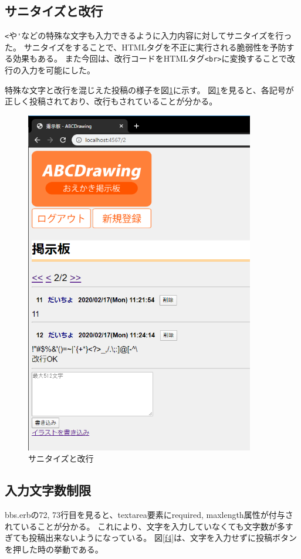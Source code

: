\documentclass[a4j,titlepage]{jsarticle}
\begin{document}
\subsection{サニタイズと改行}
\verb|<|や\verb|'|などの特殊な文字も入力できるように入力内容に対してサニタイズを行った。
サニタイズをすることで、HTMLタグを不正に実行される脆弱性を予防する効果もある。
また今回は、改行コードをHTMLタグ{\tt\verb|<br>|}に変換することで改行の入力を可能にした。

特殊な文字と改行を混じえた投稿の様子を図\ref{f3}に示す。
図\ref{f3}を見ると、各記号が正しく投稿されており、改行もされていることが分かる。

\begin{figure}[H]
  \centering
  \includegraphics[width=10cm]{bbs10.png}
  \caption{サニタイズと改行}
  \label{f3}
\end{figure}

\subsection{入力文字数制限}
bbs.erbの72, 73行目を見ると、textarea要素にrequired, maxlength属性が付与されていることが分かる。
これにより、文字を入力していなくても文字数が多すぎても投稿出来ないようになっている。
図\ref{f4}は、文字を入力せずに投稿ボタンを押した時の挙動である。
\end{document}
